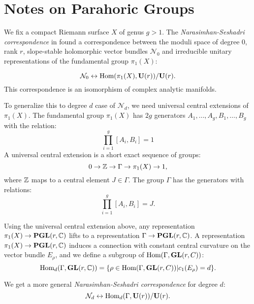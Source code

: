 \section{Notes on Parahoric Groups}

We fix a compact Riemann surface $X$ of genus $g>1$.
The \textit{Narasimhan-Seshadri correspondence} in \cite{ns} found a correspondence between the moduli space of degree $0$, rank $r$, slope-stable holomorphic vector bundles $\mathcal{N}_0$ and irreducible unitary representations of the fundamental group $\pi_1(X)$:

\begin{equation}
\mathcal{N}_0\leftrightarrow\text{Hom}(\pi_1(X),\mathbf{U}(r))/\mathbf{U}(r).
\end{equation}
This correspondence is an isomorphism of complex analytic manifolds.

To generalize this to degree $d$ case of $\mathcal{N}_d$, we need universal central extensions of $\pi_1(X)$. The fundamental group $\pi_1(X)$ has $2g$ generators $A_1,\ldots,A_g,B_1,\ldots,B_g$ with the relation:
\begin{equation}
\prod_{i=1}^g[A_i,B_i]=1
\end{equation}
A universal central extension is a short exact sequence of groups:
\begin{equation}
0\rightarrow\mathbb{Z}\rightarrow\Gamma\rightarrow\pi_1(X)\rightarrow1,
\end{equation}
where $\mathbb{Z}$ maps to a central element $J\in\Gamma$. The group $\Gamma$ has the generators with relations:
\begin{equation}
    \prod_{i=1}^g[A_i,B_i]=J.
    \end{equation}

Using the universal central extension above, any representation $\pi_1(X)\rightarrow\mathbf{PGL}(r,\mathbb{C})$ lifts to a representation $\Gamma\rightarrow\mathbf{PGL}(r,\mathbb{C})$. A representation $\pi_1(X)\rightarrow\mathbf{PGL}(r,\mathbb{C})$ induces a connection with constant central curvature on the  vector bundle $E_\rho$, and we define a subgroup of $\text{Hom}(\Gamma,\mathbf{GL}(r,C))$:
\begin{equation}
\text{Hom}_d(\Gamma,\mathbf{GL}(r,\mathbb{C}))=\{\rho\in\text{Hom}(\Gamma,\mathbf{GL}(r,C))|c_1(E_\rho)=d\}.
\end{equation}

We get a more general \textit{Narasimhan-Seshadri correspondence} for degree $d$:
\begin{equation}
    \mathcal{N}_d\leftrightarrow\text{Hom}_d(\Gamma,\mathbf{U}(r))/\mathbf{U}(r).
\end{equation}

